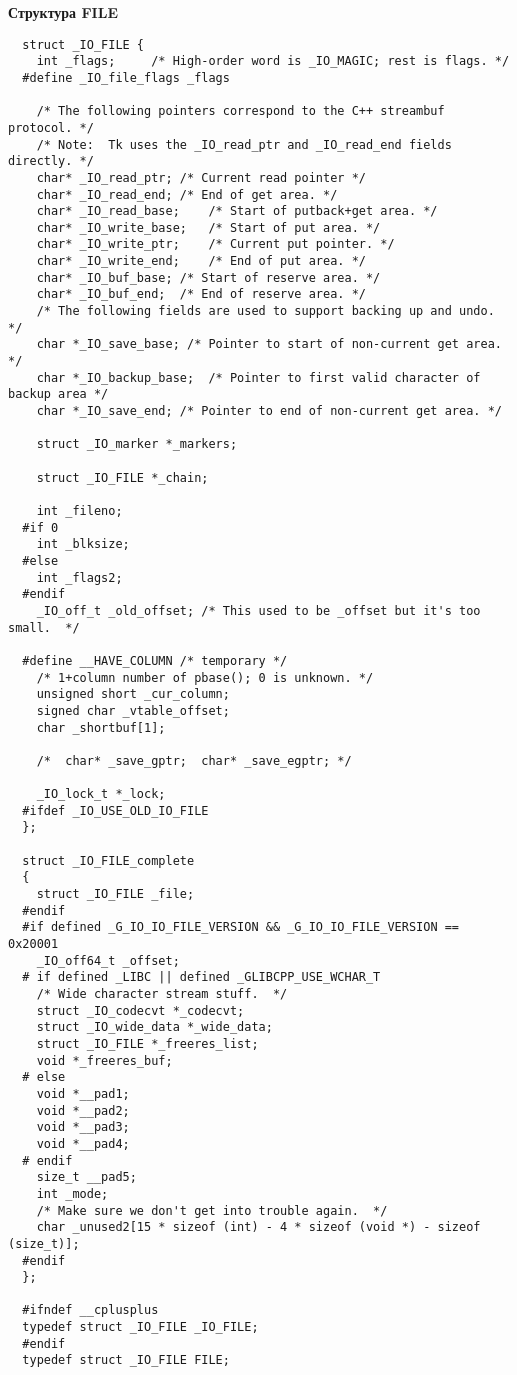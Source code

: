 \documentclass[a4paper,12pt]{article}
\begin{document}
\textbf {Структура FILE}\\
\begin{lstlisting}
  struct _IO_FILE {
    int _flags;		/* High-order word is _IO_MAGIC; rest is flags. */
  #define _IO_file_flags _flags

    /* The following pointers correspond to the C++ streambuf protocol. */
    /* Note:  Tk uses the _IO_read_ptr and _IO_read_end fields directly. */
    char* _IO_read_ptr;	/* Current read pointer */
    char* _IO_read_end;	/* End of get area. */
    char* _IO_read_base;	/* Start of putback+get area. */
    char* _IO_write_base;	/* Start of put area. */
    char* _IO_write_ptr;	/* Current put pointer. */
    char* _IO_write_end;	/* End of put area. */
    char* _IO_buf_base;	/* Start of reserve area. */
    char* _IO_buf_end;	/* End of reserve area. */
    /* The following fields are used to support backing up and undo. */
    char *_IO_save_base; /* Pointer to start of non-current get area. */
    char *_IO_backup_base;  /* Pointer to first valid character of backup area */
    char *_IO_save_end; /* Pointer to end of non-current get area. */

    struct _IO_marker *_markers;

    struct _IO_FILE *_chain;

    int _fileno;
  #if 0
    int _blksize;
  #else
    int _flags2;
  #endif
    _IO_off_t _old_offset; /* This used to be _offset but it's too small.  */

  #define __HAVE_COLUMN /* temporary */
    /* 1+column number of pbase(); 0 is unknown. */
    unsigned short _cur_column;
    signed char _vtable_offset;
    char _shortbuf[1];

    /*  char* _save_gptr;  char* _save_egptr; */

    _IO_lock_t *_lock;
  #ifdef _IO_USE_OLD_IO_FILE
  };
  
  struct _IO_FILE_complete
  {
    struct _IO_FILE _file;
  #endif
  #if defined _G_IO_IO_FILE_VERSION && _G_IO_IO_FILE_VERSION == 0x20001
    _IO_off64_t _offset;
  # if defined _LIBC || defined _GLIBCPP_USE_WCHAR_T
    /* Wide character stream stuff.  */
    struct _IO_codecvt *_codecvt;
    struct _IO_wide_data *_wide_data;
    struct _IO_FILE *_freeres_list;
    void *_freeres_buf;
  # else
    void *__pad1;
    void *__pad2;
    void *__pad3;
    void *__pad4;
  # endif
    size_t __pad5;
    int _mode;
    /* Make sure we don't get into trouble again.  */
    char _unused2[15 * sizeof (int) - 4 * sizeof (void *) - sizeof (size_t)];
  #endif
  };

  #ifndef __cplusplus
  typedef struct _IO_FILE _IO_FILE;
  #endif
  typedef struct _IO_FILE FILE;
\end{lstlisting}
\end{document}
